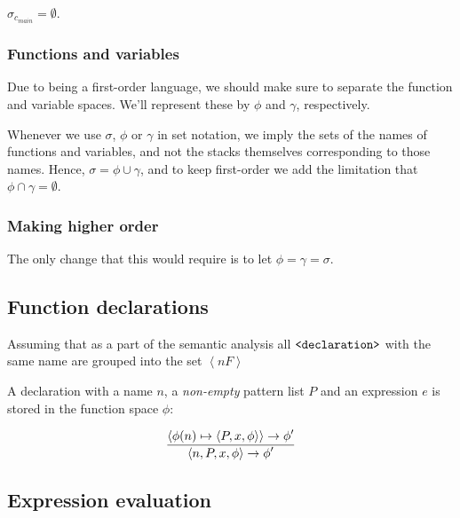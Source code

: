 \begin{corollary} $\sigma_{c_{main}}=\emptyset$. \end{corollary}


\subsubsection{Functions and variables}

Due to \D{} being a first-order language, we should make sure to separate the
function and variable spaces. We'll represent these by $\phi$ and $\gamma$,
respectively.

Whenever we use $\sigma$, $\phi$ or $\gamma$ in set notation, we imply the sets
of the names of functions and variables, and not the stacks themselves
corresponding to those names.  Hence, $\sigma=\phi\cup\gamma$, and to keep \D{}
first-order we add the limitation that $\phi\cap\gamma=\emptyset$.

\subsubsection{Making \D{} higher order}

The only change that this would require is to let $\phi=\gamma=\sigma$.

\subsection{Function declarations}

Assuming that as a part of the semantic analysis all $\text{{\ttfamily<declaration>}}$ with the same name are grouped into the set $\left\langle n F\right\rangle$

A declaration with a name $n$, a \emph{non-empty} pattern
list $P$ and an expression $e$ is stored in the function space $\phi$:

\begin{equation}\label{sem:declaration}
{\displaystyle
  \left\langle \phi(n)\mapsto \left\langle P, x, \phi\right\rangle\right\rangle
  \rightarrow
  \phi'
\over\displaystyle
  \left\langle n, P, x, \phi\right\rangle
  \rightarrow
  \phi'
}
\end{equation}

\subsection{Expression evaluation}

